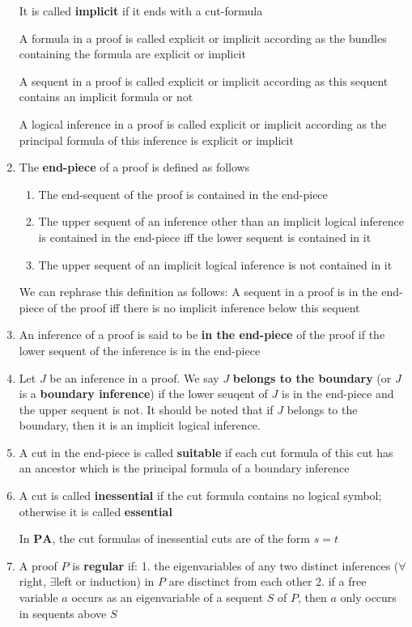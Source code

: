 \documentclass[11pt]{article}
\def \PA {\textbf{PA}}
\begin{document}
\begin{definition}[]
\begin{enumerate}
It is called \textbf{implicit} if it ends with a cut-formula

A formula in a proof is called explicit or implicit according as the bundles containing the
formula are explicit or implicit

A sequent in a proof is called explicit or implicit according as this sequent contains an
implicit formula or not

A logical inference in a proof is called explicit or implicit according as the principal
formula of this inference is explicit or implicit
\item The \textbf{end-piece} of a proof is defined as follows
\begin{enumerate}
\item The end-sequent of the proof is contained in the end-piece
\item The upper sequent of an inference other than an implicit logical inference is contained in
the end-piece iff the lower sequent is contained in it
\item The upper sequent of an implicit logical inference is not contained in it
\end{enumerate}

We can rephrase this definition as follows: A sequent in a proof is in the end-piece of the
proof iff there is no implicit inference below this sequent
\item An inference of a proof is said to be \textbf{in the end-piece} of the proof if the lower sequent of
the inference is in the end-piece
\item Let \(J\) be an inference in a proof. We say \(J\) \textbf{belongs to the boundary} (or \(J\) is a
\textbf{boundary inference}) if the lower seuqent of \(J\) is in the end-piece and the upper sequent is
not. It should be noted that if \(J\) belongs to the boundary, then it is an implicit logical inference.
\item A cut in the end-piece is called \textbf{suitable} if each cut formula of this cut has an ancestor
which is the principal formula of a boundary inference
\item A cut is called \textbf{inessential} if the cut formula contains no logical symbol; otherwise it is
called \textbf{essential}

In \(\PA\), the cut formulas of inessential cuts are of the form \(s=t\)
\item A proof \(P\) is \textbf{regular} if: 1. the eigenvariables of any two distinct inferences
(\(\forall\)right, \(\exists\)left or induction) in \(P\) are disctinct from each other 2. if
a free variable \(a\) occurs as an eigenvariable of a sequent \(S\) of \(P\), then \(a\) only
occurs in sequents above \(S\)
\end{enumerate}
\end{definition}
\end{document}
